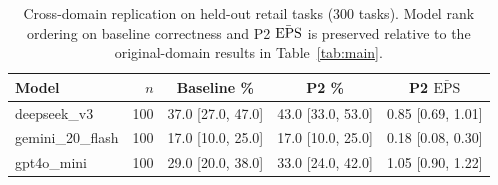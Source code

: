 \begin{table}[t]
\centering\small
\caption{Cross-domain replication on held-out retail tasks (300 tasks). Model rank ordering on baseline correctness and P2 $\bar{\mathrm{EPS}}$ is preserved relative to the original-domain results in Table~\ref{tab:main}.}
\label{tab:retail}
\begin{tabular}{lrccc}
\toprule
Model & $n$ & Baseline \% & P2 \% & P2 $\bar{\mathrm{EPS}}$ \\
\midrule
deepseek\_v3 & 100 & 37.0 [27.0, 47.0] & 43.0 [33.0, 53.0] & 0.85 [0.69, 1.01] \\
gemini\_20\_flash & 100 & 17.0 [10.0, 25.0] & 17.0 [10.0, 25.0] & 0.18 [0.08, 0.30] \\
gpt4o\_mini & 100 & 29.0 [20.0, 38.0] & 33.0 [24.0, 42.0] & 1.05 [0.90, 1.22] \\
\bottomrule
\end{tabular}
\end{table}